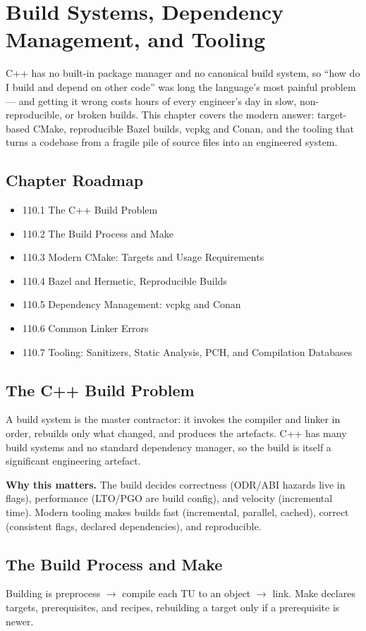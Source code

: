 \chapter{Build Systems, Dependency Management, and Tooling}

C++ has no built-in package manager and no canonical build system, so ``how do I build and depend on other code'' was long the language's most painful problem --- and getting it wrong costs hours of every engineer's day in slow, non-reproducible, or broken builds. This chapter covers the modern answer: target-based CMake, reproducible Bazel builds, vcpkg and Conan, and the tooling that turns a codebase from a fragile pile of source files into an engineered system.

\section*{Chapter Roadmap}
\begin{itemize}
\item 110.1 The C++ Build Problem
\item 110.2 The Build Process and Make
\item 110.3 Modern CMake: Targets and Usage Requirements
\item 110.4 Bazel and Hermetic, Reproducible Builds
\item 110.5 Dependency Management: vcpkg and Conan
\item 110.6 Common Linker Errors
\item 110.7 Tooling: Sanitizers, Static Analysis, PCH, and Compilation Databases
\end{itemize}

\section{The C++ Build Problem}
A build system is the master contractor: it invokes the compiler and linker in order, rebuilds only what changed, and produces the artefacts. C++ has many build systems and no standard dependency manager, so the build is itself a significant engineering artefact.

\textbf{Why this matters.} The build decides correctness (ODR/ABI hazards live in flags), performance (LTO/PGO are build config), and velocity (incremental time). Modern tooling makes builds fast (incremental, parallel, cached), correct (consistent flags, declared dependencies), and reproducible.

\section{The Build Process and Make}
Building is preprocess $\to$ compile each TU to an object $\to$ link. Make declares targets, prerequisites, and recipes, rebuilding a target only if a prerequisite is newer.

